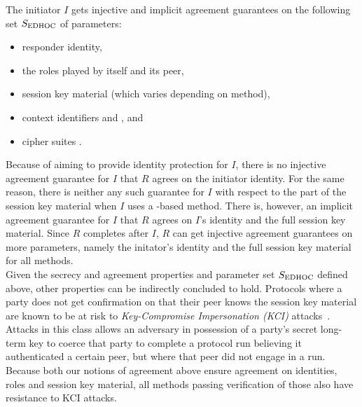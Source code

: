The initiator $I$ gets injective and implicit agreement guarantees on the
following set $S_{\text{EDHOC}}$ of parameters:
\begin{itemize}
    \item responder identity,
    \item the roles played by itself and its peer,
    \item session key material (which varies depending on \mEdhoc{} method),
    \item context identifiers \mCi{} and \mCr{}, and
    \item cipher suites \mSuites{}.
\end{itemize}
%
Because of \mEdhoc{} aiming to provide identity protection for $I$, there is no
injective agreement guarantee for $I$ that $R$ agrees on the initiator identity.
%
For the same reason, there is neither any such guarantee for $I$ with respect to
the \mGiy{} part of the session key material when $I$ uses a \mStat{}-based
method.
%
There is, however, an implicit agreement guarantee for $I$ that $R$ agrees on
$I$'s identity and the full session key material.
%
Since $R$ completes after $I$, $R$ can get injective agreement guarantees on
more parameters, namely the initator's identity and the full session key
material for all methods.\\
%

Given the secrecy and agreement properties and parameter set $S_{\text{EDHOC}}$ defined
above, other properties can be indirectly concluded to hold.
%
Protocols where a party does not get confirmation on that their peer knows the
session key material are known to be at risk to
\emph{Key-Compromise Impersonation (KCI)}
attacks~\cite{DBLP:conf/ima/Blake-WilsonJM97}.
%
Attacks in this class allows an adversary in possession of a party's secret
long-term key to coerce that party to complete a
protocol run believing it authenticated a certain peer, but where that peer did
not engage in a run.
%
Because both our notions of agreement above ensure agreement on identities,
roles and session key material, all methods passing verification of those also
have resistance to KCI attacks.
%

